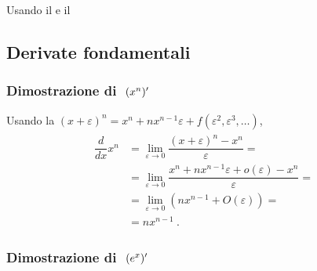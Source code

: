 \documentclass[letterpaper,10pt,italian]{jupyterBook}
\begin{document}
\sphinxAtStartPar
{} Usando il {\hyperref[\detokenize{ch/infinitesimal_calculus/derivatives:infinitesimal-calculus-derivatives-thm-cauchy}]{}} e il {\hyperref[\detokenize{ch/infinitesimal_calculus/derivatives:infinitesimal-calculus-derivatives-thm-lagrange}]{}} 


\subsection{Derivate fondamentali}
\label{\detokenize{ch/infinitesimal_calculus/derivatives-notes:derivate-fondamentali}}\label{\detokenize{ch/infinitesimal_calculus/derivatives-notes:infinitesimal-calculus-derivatives-fund-notes}}\subsubsection*{Dimostrazione di \protect\(\ (x^n)'\protect\)}

\sphinxAtStartPar
Usando la {\hyperref[\detokenize{ch/precalculus/polynomials:math-hs-precalculus-polynomials-binomial-thm}]{}} \((x + \varepsilon)^n = x^n + n x^{n-1} \varepsilon + f(\varepsilon^2, \varepsilon^3, \dots)\),
\begin{equation*}
\begin{split}\begin{aligned}
  \dfrac{d}{dx} x^n
  & = \lim_{\varepsilon \rightarrow 0}  \dfrac{(x+\varepsilon)^{n} - x^n}{\varepsilon} = \\
  & = \lim_{\varepsilon \rightarrow 0}  \dfrac{x^n + n x^{n-1} \varepsilon + o(\varepsilon) - x^n}{\varepsilon} = \\
  & = \lim_{\varepsilon \rightarrow 0}  \left( n x^{n-1} + O(\varepsilon) \right) = \\
  & = n x^{n-1} \ .
\end{aligned}\end{split}
\end{equation*}\subsubsection*{Dimostrazione di \protect\(\ (e^x)'\protect\)}
\end{document}
